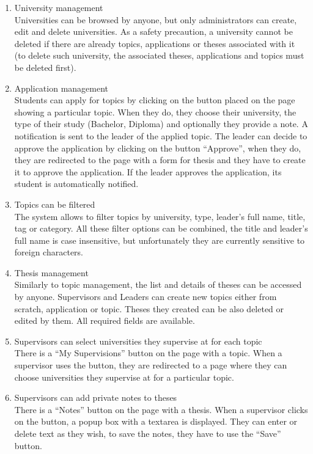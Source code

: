\begin{enumerate}
    \item University management\\
    Universities can be browsed by anyone, but only administrators can create, edit and delete universities. As a safety precaution, a university cannot be deleted if there are already topics, applications or theses associated with it (to delete such university, the associated theses, applications and topics must be deleted first).

    \item Application management\\
    Students can apply for topics by clicking on the button placed on the page showing a particular topic. When they do, they choose their university, the type of their study (Bachelor, Diploma) and optionally they provide a note. A notification is sent to the leader of the applied topic. The leader can decide to approve the application by clicking on the button ``Approve'', when they do, they are redirected to the page with a form for thesis and they have to create it to approve the application. If the leader approves the application, its student is automatically notified.

    \item Topics can be filtered\\
    The system allows to filter topics by university, type, leader's full name, title, tag or category. All these filter options can be combined, the title and leader's full name is case insensitive, but unfortunately they are currently  sensitive to foreign characters.

    \item Thesis management\\
    Similarly to topic management, the list and details of theses can be accessed by anyone. Supervisors and Leaders can create new topics either from scratch, application or topic. Theses they created can be also deleted or edited by them. All required fields are available.

    \item Supervisors can select universities they supervise at for each topic\\
    There is a ``My Supervisions'' button on the page with a topic. When a supervisor uses the button, they are redirected to a page where they can choose universities they supervise at for a particular topic.

    \item Supervisors can add private notes to theses\\
    There is a ``Notes'' button on the page with a thesis. When a supervisor clicks on the button, a popup box with a textarea is displayed. They can enter or delete text as they wish, to save the notes, they have to use the ``Save'' button.


\end{enumerate}
